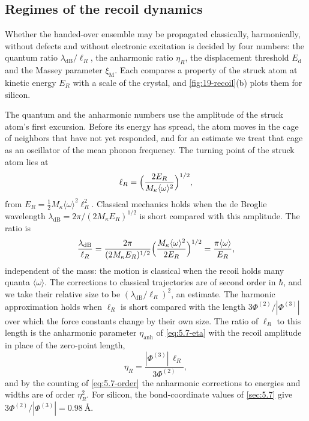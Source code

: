 \subsection{Regimes of the recoil dynamics}\label{sec:19.1-regimes}

Whether the handed-over ensemble may be propagated classically, harmonically, without defects and without electronic excitation is decided by four numbers: the quantum ratio $\lambda_{\mathrm{dB}}/\ell_R$, the anharmonic ratio $\eta_R$, the displacement threshold $E_{\mathrm{d}}$ and the Massey parameter $\xi_{\mathrm{M}}$. Each compares a property of the struck atom at kinetic energy $E_R$ with a scale of the crystal, and \cref{fig:19-recoil}(b) plots them for silicon.

The quantum and the anharmonic numbers use the amplitude of the struck atom's first excursion. Before its energy has spread, the atom moves in the cage of neighbors that have not yet responded, and for an estimate we treat that cage as an oscillator of the mean phonon frequency. The turning point of the struck atom lies at
\begin{equation*}
  \ell_R = \Bigl(\frac{2E_R}{M_\kappa\langle\omega\rangle^2}\Bigr)^{1/2} ,
\end{equation*}
from $E_R = \tfrac12M_\kappa\langle\omega\rangle^2\ell_R^2$. Classical mechanics holds when the de Broglie wavelength $\lambda_{\mathrm{dB}} = 2\pi/(2M_\kappa E_R)^{1/2}$ is short compared with this amplitude. The ratio is
\begin{equation*}
  \frac{\lambda_{\mathrm{dB}}}{\ell_R} = \frac{2\pi}{(2M_\kappa E_R)^{1/2}}\Bigl(\frac{M_\kappa\langle\omega\rangle^2}{2E_R}\Bigr)^{1/2} = \frac{\pi\langle\omega\rangle}{E_R} ,
\end{equation*}
independent of the mass: the motion is classical when the recoil holds many quanta $\langle\omega\rangle$. The corrections to classical trajectories are of second order in $\hbar$, and we take their relative size to be $(\lambda_{\mathrm{dB}}/\ell_R)^2$, an estimate. The harmonic approximation holds when $\ell_R$ is short compared with the length $3\Phi^{(2)}/|\Phi^{(3)}|$ over which the force constants change by their own size. The ratio of $\ell_R$ to this length is the anharmonic parameter $\eta_{\mathrm{anh}}$ of \cref{eq:5.7-eta} with the recoil amplitude in place of the zero-point length,
\begin{equation*}
  \eta_R = \frac{|\Phi^{(3)}|\,\ell_R}{3\Phi^{(2)}} ,
\end{equation*}
and by the counting of \cref{eq:5.7-order} the anharmonic corrections to energies and widths are of order $\eta_R^2$. For silicon, the bond-coordinate values of \cref{sec:5.7} give $3\Phi^{(2)}/|\Phi^{(3)}| = \SI{0.98}{\angstrom}$.

